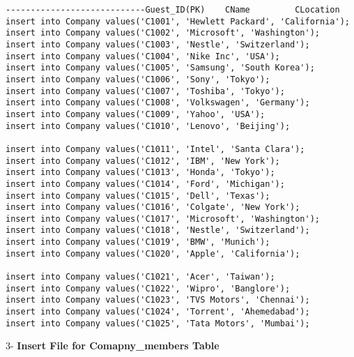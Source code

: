 \documentclass[a4,12pt]{report}
\begin{document}
\begin{lstlisting}
----------------------------Guest_ID(PK)    CName         CLocation  
insert into Company values('C1001', 'Hewlett Packard', 'California');
insert into Company values('C1002', 'Microsoft', 'Washington');
insert into Company values('C1003', 'Nestle', 'Switzerland');
insert into Company values('C1004', 'Nike Inc', 'USA');
insert into Company values('C1005', 'Samsung', 'South Korea');
insert into Company values('C1006', 'Sony', 'Tokyo');
insert into Company values('C1007', 'Toshiba', 'Tokyo');
insert into Company values('C1008', 'Volkswagen', 'Germany');
insert into Company values('C1009', 'Yahoo', 'USA');
insert into Company values('C1010', 'Lenovo', 'Beijing');

insert into Company values('C1011', 'Intel', 'Santa Clara');
insert into Company values('C1012', 'IBM', 'New York');
insert into Company values('C1013', 'Honda', 'Tokyo');
insert into Company values('C1014', 'Ford', 'Michigan');
insert into Company values('C1015', 'Dell', 'Texas');
insert into Company values('C1016', 'Colgate', 'New York');
insert into Company values('C1017', 'Microsoft', 'Washington');
insert into Company values('C1018', 'Nestle', 'Switzerland');
insert into Company values('C1019', 'BMW', 'Munich');
insert into Company values('C1020', 'Apple', 'California');

insert into Company values('C1021', 'Acer', 'Taiwan');
insert into Company values('C1022', 'Wipro', 'Banglore');
insert into Company values('C1023', 'TVS Motors', 'Chennai');
insert into Company values('C1024', 'Torrent', 'Ahemedabad');
insert into Company values('C1025', 'Tata Motors', 'Mumbai');

\end{lstlisting}

\begin{flushleft}
3- \textbf{Insert File for Comapny\_members Table \\ }
\end{flushleft}
\end{document}
